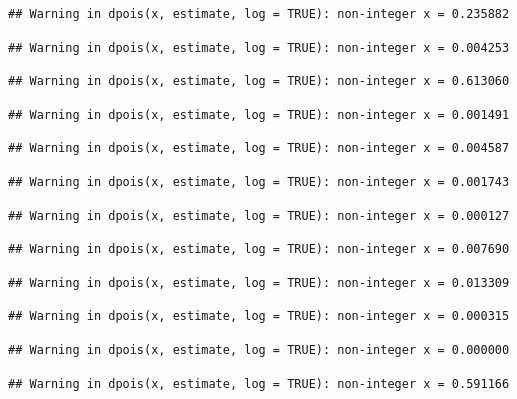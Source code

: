 \documentclass[]{article}
\begin{document}
\begin{verbatim}
## Warning in dpois(x, estimate, log = TRUE): non-integer x = 0.235882
\end{verbatim}

\begin{verbatim}
## Warning in dpois(x, estimate, log = TRUE): non-integer x = 0.004253
\end{verbatim}

\begin{verbatim}
## Warning in dpois(x, estimate, log = TRUE): non-integer x = 0.613060
\end{verbatim}

\begin{verbatim}
## Warning in dpois(x, estimate, log = TRUE): non-integer x = 0.001491
\end{verbatim}

\begin{verbatim}
## Warning in dpois(x, estimate, log = TRUE): non-integer x = 0.004587
\end{verbatim}

\begin{verbatim}
## Warning in dpois(x, estimate, log = TRUE): non-integer x = 0.001743
\end{verbatim}

\begin{verbatim}
## Warning in dpois(x, estimate, log = TRUE): non-integer x = 0.000127
\end{verbatim}

\begin{verbatim}
## Warning in dpois(x, estimate, log = TRUE): non-integer x = 0.007690
\end{verbatim}

\begin{verbatim}
## Warning in dpois(x, estimate, log = TRUE): non-integer x = 0.013309
\end{verbatim}

\begin{verbatim}
## Warning in dpois(x, estimate, log = TRUE): non-integer x = 0.000315
\end{verbatim}

\begin{verbatim}
## Warning in dpois(x, estimate, log = TRUE): non-integer x = 0.000000
\end{verbatim}

\begin{verbatim}
## Warning in dpois(x, estimate, log = TRUE): non-integer x = 0.591166
\end{verbatim}
\end{document}
